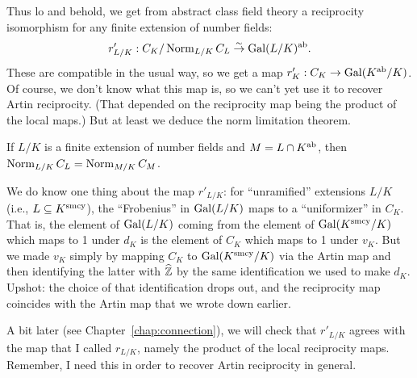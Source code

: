 Thus lo and behold, we get from abstract class field theory a
reciprocity isomorphism for any finite extension of number fields:
\[
r'_{L/K}: C_K/\operatorname{Norm}_{L/K} C_L \stackrel{\sim}{\to} \operatorname{Gal}(L/K)^{\operatorname{ab}}.
\]
These are compatible in the usual way, so we get a map
$r'_K: C_K \to \operatorname{Gal}(K^{\operatorname{ab}}/K)$. Of course, we don't know what this map is,
so we can't yet use it to recover Artin reciprocity. (That depended on
the reciprocity map being the product of the local maps.) But at least
we deduce the norm limitation theorem.
\begin{theorem} \label{T:adelic norm limitation}
If $L/K$ is a finite extension of number fields and
$M = L \cap K^{\operatorname{ab}}$, then $\operatorname{Norm}_{L/K} C_L = \operatorname{Norm}_{M/K} C_M$.
\end{theorem}

We do know one thing about the map $r'_{L/K}$: for ``unramified'' extensions
$L/K$ (i.e., $L \subseteq K^{\operatorname{smcy}}$),
the ``Frobenius'' in $\operatorname{Gal}(L/K)$ maps to a ``uniformizer'' in
$C_K$. That is, the element of $\operatorname{Gal}(L/K)$ coming from the element
of $\operatorname{Gal}(K^{\operatorname{smcy}}/K)$ which maps to 1 under $d_K$ is the element of
$C_K$ which maps to 1 under $v_K$. But we made $v_K$ simply by
mapping $C_K$ to $\operatorname{Gal}(K^{\operatorname{smcy}}/K)$ via the Artin map and then 
identifying the latter with $\widehat{\mathbb{Z}}$ by the same identification
we used to make $d_K$. Upshot: the choice of that identification drops
out, and the reciprocity map coincides with the Artin map that we
wrote down earlier.

A bit later (see Chapter~\ref{chap:connection}), 
we will check that $r'_{L/K}$ agrees with
the map that I called $r_{L/K}$, namely
the product of the local reciprocity maps. Remember, I need this in order
to recover Artin reciprocity in general.

%

